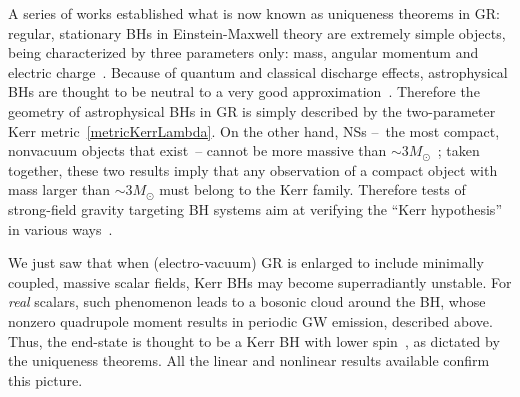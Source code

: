 \documentclass[11pt]{article}
\numberwithin{equation}{section} %
\begin{document}
A series of works established what is now known as uniqueness theorems in GR:
regular, stationary BHs in Einstein-Maxwell theory are extremely simple
objects, being characterized by three parameters only: mass, angular momentum and electric 
charge~\cite{Bekenstein:1996pn,Carter:1997im,Heusler:1998ua,Chrusciel:2012jk,uniqueness,Cardoso:2016ryw}.
Because of quantum and classical discharge effects, astrophysical BHs are thought to be neutral to a very good
approximation~\cite{Gibbons:1975kk,Goldreich:1969sb,Ruderman:1975ju,Blandford:1977ds,Barausse:2014tra,Cardoso:2016olt}.
Therefore the geometry of astrophysical BHs in GR is simply described by the two-parameter Kerr 
metric~\eqref{metricKerrLambda}. 
%
On the other hand, NSs --~the most compact, nonvacuum objects that exist~-- cannot be more massive than $\sim 
3M_\odot$~\cite{Rhoades:1974fn};
taken together, these two results imply that any observation of a compact object with mass larger than $\sim 3M_\odot$ 
must belong to the Kerr family. Therefore tests of strong-field gravity targeting
BH systems aim at verifying the ``Kerr hypothesis'' in various ways~\cite{Berti:2015itd,Cardoso:2016ryw}.


We just saw that when (electro-vacuum) GR is enlarged to include minimally coupled, massive scalar fields, Kerr BHs 
may become superradiantly unstable.
For {\it real} scalars, such phenomenon leads to a bosonic cloud around the BH, whose nonzero quadrupole moment results in
periodic GW emission, described above. Thus, the end-state is thought to be a Kerr BH
with lower spin~\cite{Witek:2012tr,Okawa:2014nda,Cardoso:2013krh}, as dictated by the uniqueness theorems.
All the linear and nonlinear results available confirm this picture.
\end{document}
